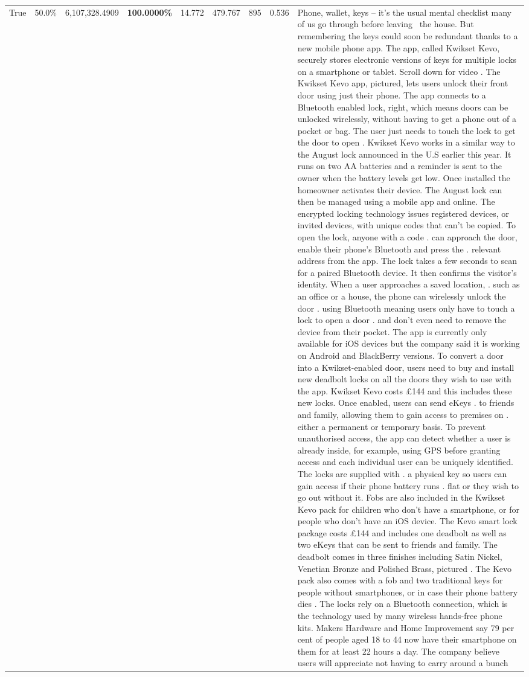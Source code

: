 \begin{table}[H]
\begin{tabular}{lllrlllll}
True & 50.0\% & 6,107,328.4909 & \bfseries \color{red} 100.0000\% & 14.772 & 479.767 & 895 & 0.536 & Phone, wallet, keys – it’s the usual mental checklist many of us go through before leaving  the house. But remembering the keys could soon be redundant thanks to a new mobile phone app. The app, called Kwikset Kevo, securely stores electronic versions of keys for multiple locks on a smartphone or tablet. Scroll down for video . The Kwikset Kevo app, pictured, lets users unlock their front door using just their phone. The app connects to a Bluetooth enabled lock, right, which means doors can be unlocked wirelessly, without having to get a phone out of a pocket or bag. The user just needs to touch the lock to get the door to open . Kwikset Kevo works in a similar way to the August lock announced in the U.S earlier this year. It runs on two AA batteries and a reminder is sent to the owner when the battery levels get low. Once installed the homeowner activates their device. The August lock can then be managed using a mobile app and online. The encrypted locking technology issues registered devices, or invited devices, with unique codes that can't be copied. To open the lock, anyone with a code . can approach the door, enable their phone's Bluetooth and press the . relevant address from the app. The lock takes a few seconds to scan for a paired Bluetooth device. It then confirms the visitor's identity. When a user approaches a saved location, . such as an office or a house, the phone can wirelessly unlock the door . using Bluetooth meaning users only have to touch a lock to open a door . and don't even need to remove the device from their pocket. The app is currently only available for iOS devices but the company said it is working on Android and BlackBerry versions. To convert a door into a Kwikset-enabled door, users need to buy and install new deadbolt locks on all the doors they wish to use with the app. Kwikset Kevo costs £144 and this includes these new locks. Once enabled, users can send eKeys . to friends and family, allowing them to gain access to premises on . either a permanent or temporary basis. To prevent unauthorised access, the app can detect whether a user is already inside, for example, using GPS before granting access and each individual user can be uniquely identified. The locks are supplied with . a physical key so users can gain access if their phone battery runs . flat or they wish to go out without it. Fobs are also included in the Kwikset Kevo pack for children who don't have a smartphone, or for people who don't have an iOS device. The Kevo smart lock package costs £144 and includes one deadbolt as well as two eKeys that can be sent to friends and family. The deadbolt comes in three finishes including Satin Nickel, Venetian Bronze and Polished Brass, pictured . The Kevo pack also comes with a fob and two traditional keys for people without smartphones, or in case their phone battery dies . The locks rely on a Bluetooth connection, which is the technology used by many wireless hands-free phone kits. Makers Hardware and Home Improvement say 79 per cent of people aged 18 to 44 now have their smartphone on them for at least 22 hours a day. The company believe users will appreciate not having to carry around a bunch 
\end{tabular}
\end{table}
